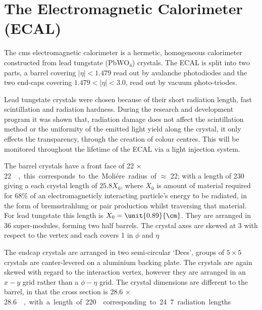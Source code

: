 
\section{The Electromagnetic Calorimeter (ECAL)} %
\label{sec:the_electromagnetic_calorimeter}
The \ac{cms} electromagnetic calorimeter is a hermetic,
homogeneous calorimeter constructed from lead tungstate (PbWO$_{4}$) crystals.
The ECAL is split into two parts, a barrel covering $|\eta| < 1.479$ read out
by avalanche photodiodes and the two end-caps covering $1.479 < |\eta| < 3.0$,
read out by vacuum photo-triodes.

Lead tungstate crystals were chosen because of their short radiation length,
fast scintillation and radiation hardness. During the research and development
program it was shown that, radiation damage does not affect the scintillation
method or the uniformity of the emitted light yield along the crystal, it only
effects the transparency, through the creation of colour centres. This will be
monitored throughout the lifetime of the ECAL via a light injection
system.

The barrel crystals have a front face of \unit{22 $\times$ 22}{\mm\squared},
this corresponds to the Moliére radius of $\approx $ \unit{22}{\mm}; with a
length of \unit{230}{\mm} giving a each crystal length of $25.8 X_{0}$, where
$X_{0}$ is amount of material required for 68$\%$ of an electromagneticly
interacting particle's energy to be radiated, in the form of bremsstrahlung or
pair production whilst traversing that material. For lead tungstate this length
is $X_{0}= \unit{0.89}{\cm}$. They are arranged in 36 super-modules, forming
two half barrels. The crystal axes are skewed at \unit{3}{\degree} with respect
to the vertex and each covers \unit{1}{\degree} in $\phi$ and $\eta$

The endcap crystals are arranged in two semi-circular `Dees', groups of
$5\times 5$ crystals are canter-levered on a aluminium backing plate. The
crystals are again skewed with regard to the interaction vertex, however they
are arranged in an $x-y$ grid rather than a $\phi - \eta$ grid. The crystal
dimensions are different to the barrel, in that the cross section is \unit{28.6
$\times$ 28.6}{\mm\squared}, with a length of \unit{220}{\mm} corresponding to
24.7 radiation lengths

